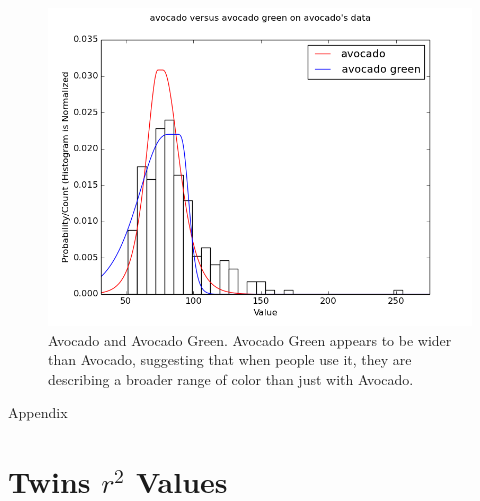 \documentclass[12pt, letterpaper]{article}
\begin{document}
\begin{figure}[h]
\begin{center}
\includegraphics[width=.75\textwidth]{avocado}
\end{center}
\caption{Avocado and Avocado Green. Avocado Green appears to be wider than Avocado, suggesting that when people use it, they are describing a broader range of color than just with Avocado.}
\label{fig:avocado}
\end{figure}


\pagebreak
\appendix{}
Appendix
\section{Twins $r^2$ Values}
\label{app:r2_values}
\end{document}

